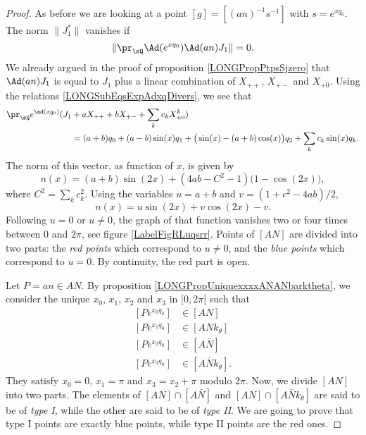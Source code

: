 \begin{proof}
    As before we are looking at a point $[g]=[(an)^{-1}s^{-1}]$ with $s= e^{xq_0}$. The norm $\| J_1^* \|$ vanishes if
    \begin{equation}
        \| \pr_{\sQ} \Ad( e^{xq_0})\Ad(an)J_1 \|=0.
    \end{equation}
    We already argued in the proof of proposition \ref{LONGPropPtpsSjzero} that $\Ad(an)J_1$ is equal to $J_1$ plus a linear combination of $X_{++}$, $X_{+-}$ and $X_{+0}$. Using the relations \eqref{LONGSubEqsExpAdxqDivers}, we see that
    \begin{equation}        \label{LONGEqprQexpxqzXanroots}
        \begin{aligned}[]
            \pr_{\sQ} e^{\ad(xq_0)}(J_1&+aX_{++}+bX_{+-}+\sum_k c_kX^k_{+0})\\
                                &=(a+b)q_0+(a-b)\sin(x)q_1+\big( \sin(x)-(a+b)\cos(x) \big)q_2+\sum _k c_k\sin(x)q_k.
        \end{aligned}
    \end{equation}
    The norm of this vector, as function of $x$, is given by
    \begin{equation}
        n(x)=(a+b)\sin(2x)+(4ab-C^2-1)\big( 1-\cos(2x) \big),
    \end{equation}
    where $C^2=\sum_kc_k^2$. Using the variables $u=a+b$ and $v=(1+c^2-4ab)/2$,
    \begin{equation}
        n(x)=u\sin(2x)+v\cos(2x)-v.
    \end{equation}
    Following $u=0$ or $u\neq 0$, the graph of that function vanishes two or four times between $0$ and $2\pi$, see figure \ref{LabelFigRLuqsrr}. Points of $[AN]$ are divided into two parts: the \emph{red points} which correspond to $u\neq 0$, and the \emph{blue points} which correspond to $u=0$. By continuity, the red part is open.


\newcommand{\CaptionFigRLuqsrr}{In red, the function $n(x)$ with $u\neq 0$ and in blue, the function with $u=0$.}


    Let $P=an\in AN$. 
    By proposition \ref{LONGPropUniquexxxxANANbarktheta}, we consider the unique  $x_0$, $x_1$, $x_2$ and $x_3$ in $\mathopen[ 0 , 2\pi [$ such that 
\begin{subequations}
    \begin{align}
        [P e^{x_0q_0}]&\in[AN]\\
        [P e^{x_1q_0}]&\in[ANk_{\theta}]\\
        [P e^{x_2q_0}]&\in[A\bar N]\\
        [P e^{x_3q_0}]&\in[A\bar Nk_{\theta}].
    \end{align}
\end{subequations}
They satisfy $x_0=0$, $x_1=\pi$ and $x_3=x_2+\pi$ modulo $2\pi$. Now, we divide $[AN]$ into two parts. The elements of $[AN]\cap [A\bar N]$ and $[AN]\cap[A\bar Nk_{\theta}]$ are said to be of \emph{type I}, while the other are said to be of \emph{type II}. We are going to prove that type I points are exactly blue points, while type II points are the red ones.


\end{proof}

